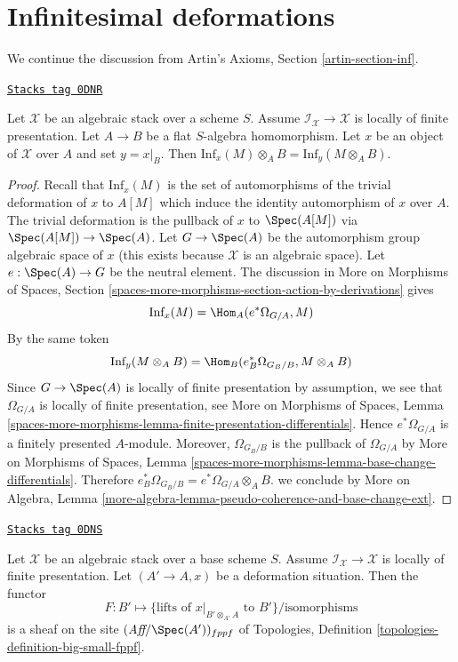 \section{Infinitesimal deformations}
\label{stacks-more-morphisms-section-inf}
We continue the discussion from
Artin's Axioms, Section \ref{artin-section-inf}.

\begin{lemma}
\label{stacks-more-morphisms-lemma-inf-quasi-coherent}
\href{https://stacks.math.columbia.edu/tag/0DNR}{\texttt{Stacks tag 0DNR}}

Let $\mathcal{X}$ be an algebraic stack over a scheme $S$.
Assume $\mathcal{I}_\mathcal{X} \to \mathcal{X}$ is locally
of finite presentation. Let $A \to B$ be a flat $S$-algebra homomorphism.
Let $x$ be an object of $\mathcal{X}$ over $A$ and set $y = x|_B$.
Then $\text{Inf}_x(M) \otimes_A B = \text{Inf}_y(M \otimes_A B)$.
\end{lemma}

\begin{proof}
Recall that $\text{Inf}_x(M)$ is the set of automorphisms of the
trivial deformation of $x$ to $A[M]$ which induce the identity
automorphism of $x$ over $A$. The trivial deformation is
the pullback of $x$ to $\Spec(A[M])$ via $\Spec(A[M]) \to \Spec(A)$.
Let $G \to \Spec(A)$ be the automorphism group algebraic space of $x$
(this exists because $\mathcal{X}$ is an algebraic space).
Let $e : \Spec(A) \to G$ be the neutral element.
The discussion in More on Morphisms of Spaces, Section
\ref{spaces-more-morphisms-section-action-by-derivations}
gives
$$
\text{Inf}_x(M) = \Hom_A(e^*\Omega_{G/A}, M)
$$
By the same token
$$
\text{Inf}_y(M \otimes_A B) = \Hom_B(e_B^*\Omega_{G_B/B}, M \otimes_A B)
$$
Since $G \to \Spec(A)$ is locally of finite presentation by
assumption, we see that $\Omega_{G/A}$ is locally of finite
presentation, see
More on Morphisms of Spaces, Lemma
\ref{spaces-more-morphisms-lemma-finite-presentation-differentials}.
Hence $e^*\Omega_{G/A}$ is a finitely presented $A$-module.
Moreover, $\Omega_{G_B/B}$ is the pullback of $\Omega_{G/A}$ by
More on Morphisms of Spaces, Lemma
\ref{spaces-more-morphisms-lemma-base-change-differentials}.
Therefore $e_B^*\Omega_{G_B/B} = e^*\Omega_{G/A} \otimes_A B$.
we conclude by More on Algebra, Lemma
\ref{more-algebra-lemma-pseudo-coherence-and-base-change-ext}.
\end{proof}

\begin{lemma}
\label{stacks-more-morphisms-lemma-sheaf-of-infinitesimal-lifts}
\href{https://stacks.math.columbia.edu/tag/0DNS}{\texttt{Stacks tag 0DNS}}

Let $\mathcal{X}$ be an algebraic stack over a base scheme $S$.
Assume $\mathcal{I}_\mathcal{X} \to \mathcal{X}$ is locally
of finite presentation. Let $(A' \to A, x)$ be a deformation situation.
Then the functor
$$
F : B' \longmapsto
\{\text{lifts of }x|_{B' \otimes_{A'} A}\text{ to } B'\}/\text{isomorphisms}
$$
is a sheaf on the site $(\textit{Aff}/\Spec(A'))_{fppf}$ of
Topologies, Definition \ref{topologies-definition-big-small-fppf}.
\end{lemma}

